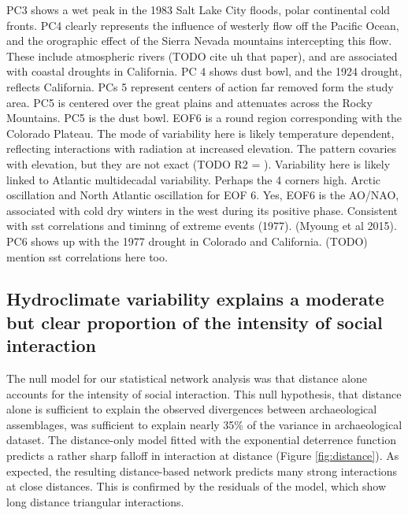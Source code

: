 \documentclass[10pt]{iopart}
\begin{document}
PC3 shows a wet peak in the 1983 Salt Lake City floods, polar continental cold fronts. PC4 clearly represents the influence of westerly flow off the Pacific Ocean, and the orographic effect of the Sierra Nevada mountains intercepting this flow. These include atmospheric rivers (TODO cite uh that paper), and are associated with coastal droughts in California. PC 4 shows dust bowl, and the 1924 drought, reflects California. PCs 5 represent centers of action far removed form the study area. PC5 is centered over the great plains and attenuates across the Rocky Mountains. PC5 is the dust bowl. EOF6 is a round region corresponding with the Colorado Plateau. The mode of variability here is likely temperature dependent, reflecting interactions with radiation at increased elevation. The pattern covaries with elevation, but they are not exact (TODO R2 = ). Variability here is likely linked to Atlantic multidecadal variability. Perhaps the 4 corners high. Arctic oscillation and North Atlantic oscillation for EOF 6. Yes, EOF6 is the AO/NAO, associated with cold dry winters in the west during its positive phase. Consistent with sst correlations and timinng of extreme events (1977). (Myoung et al 2015). PC6 shows up with the 1977 drought in Colorado and California. (TODO) mention sst correlations here too.


\subsection*{Hydroclimate variability explains a moderate but clear proportion of the intensity of social interaction}
The null model for our statistical network analysis was that distance alone accounts for the intensity of social interaction. This null hypothesis, that distance alone is sufficient to explain the observed divergences between archaeological assemblages, was sufficient to explain nearly 35\% of the variance in archaeological dataset. The distance-only model fitted with the exponential deterrence function predicts a rather sharp falloff in interaction at distance (Figure \ref{fig:distance}). As expected, the resulting distance-based network predicts many strong interactions at close distances. This is confirmed by the residuals of the model, which show long distance triangular interactions.
\end{document}
